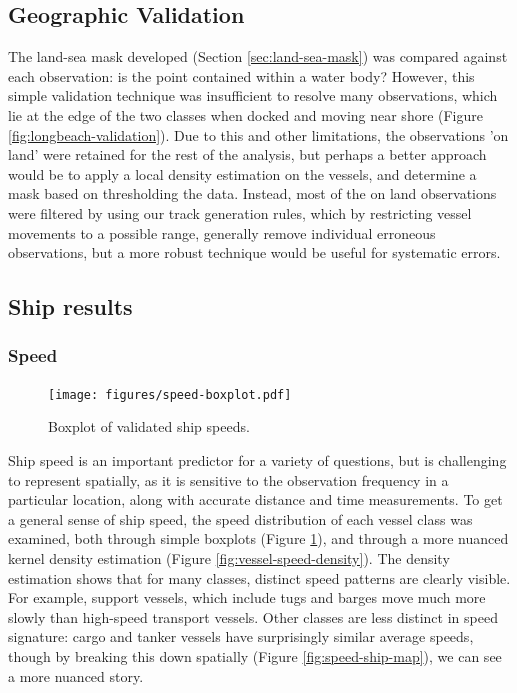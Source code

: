 \subsection{Geographic Validation}

The land-sea mask developed (Section \ref{sec:land-sea-mask}) was compared against each observation: is the point contained within a water body? However, this simple validation technique was insufficient to resolve many observations, which lie at the edge of the two classes when docked %
 and moving near shore %
(Figure \ref{fig:longbeach-validation}). Due to this and other limitations, the observations 'on land' were retained for the rest of the analysis, but perhaps a better approach would be to apply a local density estimation on the vessels, and determine a mask based on thresholding the data. Instead, most of the on land observations were filtered by using our track generation rules, which by restricting vessel movements to a possible range, generally remove individual erroneous observations, but a more robust technique would be useful for systematic errors.


\subsection{Ship results}

\subsubsection{Speed}
\begin{figure}[htbp]
  \centering
  \texttt{[image: figures/speed-boxplot.pdf]}
  \caption{Boxplot of validated ship speeds.}
  \label{fig:vessel-speed-boxplot} %
\end{figure}

Ship speed is an important predictor for a variety of questions, but is challenging to represent spatially, as it is sensitive to the observation frequency in a particular location, along with accurate distance and time measurements. To get a general sense of ship speed, the speed distribution of each vessel class was examined, both through simple boxplots (Figure \ref{fig:vessel-speed-boxplot}), and through a more nuanced kernel density estimation (Figure \ref{fig:vessel-speed-density}). The density estimation shows that for many classes, distinct speed patterns are clearly visible. For example, support vessels, which include tugs and barges move much more slowly than high-speed transport vessels. Other classes are less distinct in speed signature: cargo and tanker vessels have surprisingly similar average speeds, though by breaking this down spatially (Figure \ref{fig:speed-ship-map}), we can see a more nuanced story.


